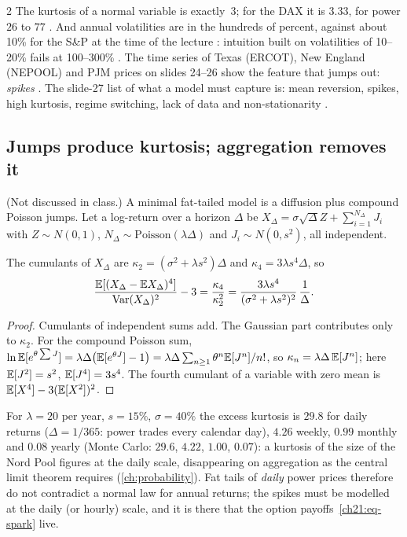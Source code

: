 \begin{paracol}{2}
The kurtosis of a normal variable is exactly~3; for the DAX it is $3.33$, for power $26$ to $77$ . And annual volatilities are in the hundreds of percent, against about 10\% for the S\&P at the time of the lecture
: intuition built on volatilities of 10--20\% fails at 100--300\% . The time series of Texas (ERCOT), New England (NEPOOL) and PJM prices on slides 24--26 show the feature that jumps out: \emph{spikes} . The slide-27 list of
what a model must capture is: mean reversion, spikes, high kurtosis, regime switching, lack of data and non-stationarity .

\subsection{Jumps produce kurtosis; aggregation removes it}\label{ch21:sec-jumpkurt}
(Not discussed in class.) A minimal fat-tailed model is a diffusion plus compound Poisson jumps. Let a log-return over a horizon $\Delta$ be $X_\Delta=\sigma\sqrt\Delta Z+\sum_{i=1}^{N_\Delta}J_i$ with $Z\sim N(0,1)$, $N_\Delta\sim\mathrm{Poisson}(\lambda\Delta)$ and $J_i\sim N(0,s^2)$, all independent.

\begin{proposition}\label{ch21:prop-jumpkurt}
The cumulants of $X_\Delta$ are $\kappa_2=(\sigma^2+\lambda s^2)\Delta$ and $\kappa_4=3\lambda s^4\Delta$, so
\[
  \frac{\mathbb{E}[(X_\Delta-\mathbb{E} X_\Delta)^4]}{\operatorname{Var}(X_\Delta)^2}-3=\frac{\kappa_4}{\kappa_2^2}=\frac{3\lambda s^4}{(\sigma^2+\lambda s^2)^2}\,\frac1\Delta .
\]
\end{proposition}
\begin{proof}
Cumulants of independent sums add. The Gaussian part contributes only to $\kappa_2$. For the compound Poisson sum, $\ln\mathbb{E}[e^{\theta\sum J}]=\lambda\Delta\bigl(\mathbb{E}[e^{\theta J}]-1\bigr)=\lambda\Delta\sum_{n\ge1}\theta^n\mathbb{E}[J^n]/n!$, so $\kappa_n=\lambda\Delta\,\mathbb{E}[J^n]$; here $\mathbb{E}[J^2]=s^2$, $\mathbb{E}[J^4]=3s^4$. The fourth cumulant of a variable with zero mean is $\mathbb{E}[X^4]-3(\mathbb{E}[X^2])^2$.
\end{proof}
For $\lambda=20$ per year, $s=15\%$, $\sigma=40\%$ the excess kurtosis is $29.8$ for daily returns ($\Delta=1/365$: power trades every calendar day), $4.26$ weekly, $0.99$ monthly and $0.08$ yearly (Monte Carlo: $29.6$, $4.22$, $1.00$, $0.07$): a kurtosis of the size of the Nord Pool figures at the daily scale, disappearing on aggregation as the central limit
theorem requires (\cref{ch:probability}). Fat tails of \emph{daily} power prices therefore do not contradict a normal law for annual returns; the spikes must be modelled at the daily (or hourly) scale, and it is there that the option payoffs~\eqref{ch21:eq-spark} live.


\end{paracol}

